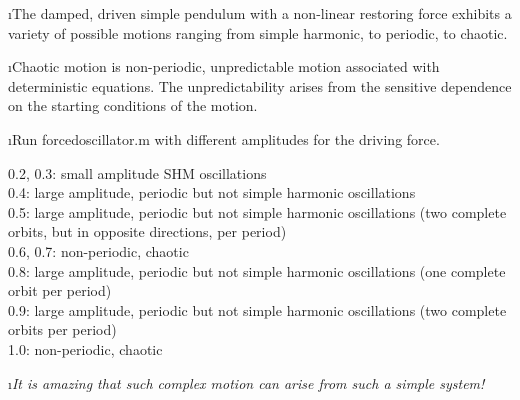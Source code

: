 \i The damped, driven simple pendulum with a
non-linear restoring force exhibits a variety of
possible motions ranging from simple harmonic, to
periodic, to chaotic.

\i Chaotic motion is non-periodic, unpredictable 
motion associated with deterministic equations.
The unpredictability arises from the sensitive
dependence on the starting conditions of the motion.

\i \demo Run forcedoscillator.m with different 
amplitudes for the driving force.

0.2, 0.3: small amplitude SHM oscillations
\\
0.4: large amplitude, periodic but not simple harmonic 
oscillations
\\
0.5: large amplitude, periodic but not simple harmonic oscillations
(two complete
orbits, but in opposite directions, per period)
\\
0.6, 0.7: non-periodic, chaotic
\\
0.8: large amplitude, periodic but not simple harmonic oscillations
(one complete orbit per period)
\\
0.9: large amplitude, periodic but not simple harmonic oscillations
(two complete orbits per period)
\\
1.0: non-periodic, chaotic

\i {\em It is amazing that such complex motion can arise
from such a simple system!}


\ei

